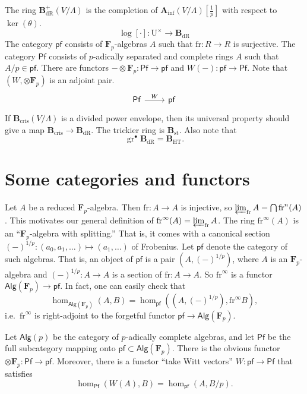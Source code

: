 \documentclass{article}
\newcommand{\dF}{\mathbf{F}}
\newcommand{\algebra}{\mathsf{Alg}}
\newcommand{\frobenius}{\mathrm{fr}}
\newcommand{\Perf}{\mathsf{Pf}}
\newcommand{\perf}{\mathsf{pf}}
\newcommand{\Ainf}{\mathbf{A}_\mathrm{inf}}
\newcommand{\Bcris}{\mathbf{B}_\mathrm{cris}}
\newcommand{\Bdr}{\mathbf{B}_\mathrm{dR}}
\newcommand{\Bst}{\mathbf{B}_\mathrm{st}}
\begin{document}
The ring $\Bdr^+(V/\Lambda)$ is the completion of $\Ainf(V/\Lambda)[\frac 1 p]$ 
with respect to $\ker(\theta)$. 
\[
  \log[\cdot]:\mathrm{U}^\times \to \Bdr
\]
The category $\perf$ consists of $\dF_p$-algebras $A$ such that  
$\frobenius:R\to R$ is surjective. The category $\Perf$ consists of 
$p$-adically separated and complete rings $A$ such that $A/p\in \perf$. 
There are functors $-\otimes \dF_p:\Perf\to \perf$ and 
$W(-):\perf\to \Perf$. Note that $(W,\otimes\dF_p)$ is an adjoint pair.
\[\begin{tikzcd}
  \mathsf{Pf} \ar[r, "W"] 
    & \mathsf{pf}
\end{tikzcd}\]
If $\Bcris(V/\Lambda)$ is a divided power envelope, then its universal 
property should give a map $\Bcris\to \Bdr$. The trickier ring is 
$\Bst$. Also note that 
\[
  \operatorname{gr}^\bullet\Bdr = \mathbf{B}_\mathrm{HT} .
\]





\section{Some categories and functors}

Let $A$ be a reduced $\dF_p$-algebra. Then $\frobenius:A\to A$ is injective, so 
$\varprojlim_\frobenius A = \bigcap \frobenius^n(A)$. This motivates our 
general definition of $\frobenius^\infty(A)=\varprojlim_\frobenius A$. The ring 
$\frobenius^\infty(A)$ is an ``$\dF_p$-algebra with splitting.'' That is, it 
comes with a canonical section $(-)^{1/p}:(a_0,a_1,\dots)\mapsto(a_1,\dots)$ of 
Frobenius. Let $\perf$ denote the category of such algebras. That is, an object 
of $\perf$ is a pair $(A,(-)^{1/p})$, where $A$ is an $\dF_p$-algebra and 
$(-)^{1/p}:A\to A$ is a section of $\frobenius:A\to A$. So $\frobenius^\infty$ 
is a functor $\algebra(\dF_p)\to \perf$. In fact, one can easily check that 
\[
  \hom_{\algebra(\dF_p)}(A,B) = \hom_\perf((A,(-)^{1/p}),\frobenius^\infty B) ,
\]
i.e.~$\frobenius^\infty$ is right-adjoint to the forgetful functor 
$\perf\to \algebra(\dF_p)$. 

Let $\algebra(p)$ be the category of $p$-adically complete algebras, and let 
$\Perf$ be the full subcategory mapping onto $\perf\subset \algebra(\dF_p)$. 
There is the obvious functor $\otimes\dF_p:\Perf\to \perf$. Moreover, there 
is a functor ``take Witt vectors'' $W:\perf\to \Perf$ that satisfies 
\[
  \hom_\Perf(W(A),B) = \hom_\perf(A,B/p) .
\]
\end{document}
